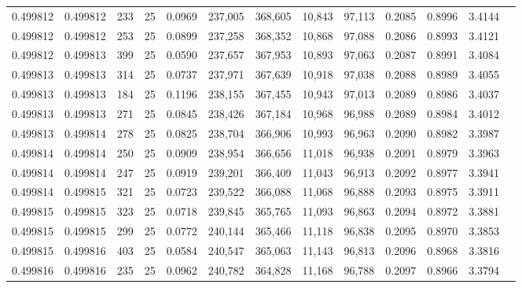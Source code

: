 \begin{tabular}{rrrrrrrrrrrrr}
0.499812 & 0.499812 &   233 &  25 &                                     0.0969 & 237,005 & 368,605 &  10,843 &  97,113 & 0.2085 & 0.8996 & 3.4144 \\
0.499812 & 0.499812 &   253 &  25 &                                     0.0899 & 237,258 & 368,352 &  10,868 &  97,088 & 0.2086 & 0.8993 & 3.4121 \\
0.499812 & 0.499813 &   399 &  25 &                                     0.0590 & 237,657 & 367,953 &  10,893 &  97,063 & 0.2087 & 0.8991 & 3.4084 \\
0.499813 & 0.499813 &   314 &  25 &                                     0.0737 & 237,971 & 367,639 &  10,918 &  97,038 & 0.2088 & 0.8989 & 3.4055 \\
0.499813 & 0.499813 &   184 &  25 &                                     0.1196 & 238,155 & 367,455 &  10,943 &  97,013 & 0.2089 & 0.8986 & 3.4037 \\
0.499813 & 0.499813 &   271 &  25 &                                     0.0845 & 238,426 & 367,184 &  10,968 &  96,988 & 0.2089 & 0.8984 & 3.4012 \\
0.499813 & 0.499814 &   278 &  25 &                                     0.0825 & 238,704 & 366,906 &  10,993 &  96,963 & 0.2090 & 0.8982 & 3.3987 \\
0.499814 & 0.499814 &   250 &  25 &                                     0.0909 & 238,954 & 366,656 &  11,018 &  96,938 & 0.2091 & 0.8979 & 3.3963 \\
0.499814 & 0.499814 &   247 &  25 &                                     0.0919 & 239,201 & 366,409 &  11,043 &  96,913 & 0.2092 & 0.8977 & 3.3941 \\
0.499814 & 0.499815 &   321 &  25 &                                     0.0723 & 239,522 & 366,088 &  11,068 &  96,888 & 0.2093 & 0.8975 & 3.3911 \\
0.499815 & 0.499815 &   323 &  25 &                                     0.0718 & 239,845 & 365,765 &  11,093 &  96,863 & 0.2094 & 0.8972 & 3.3881 \\
0.499815 & 0.499815 &   299 &  25 &                                     0.0772 & 240,144 & 365,466 &  11,118 &  96,838 & 0.2095 & 0.8970 & 3.3853 \\
0.499815 & 0.499816 &   403 &  25 &                                     0.0584 & 240,547 & 365,063 &  11,143 &  96,813 & 0.2096 & 0.8968 & 3.3816 \\
0.499816 & 0.499816 &   235 &  25 &                                     0.0962 & 240,782 & 364,828 &  11,168 &  96,788 & 0.2097 & 0.8966 & 3.3794 \\

\end{tabular}
